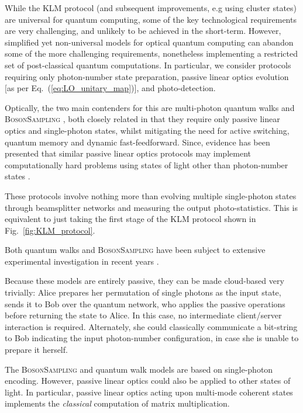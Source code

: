 While the KLM protocol (and subsequent improvements, e.g using cluster states) are universal for quantum computing, some of the key technological requirements are very challenging, and unlikely to be achieved in the short-term. However, simplified yet non-universal models for optical quantum computing can abandon some of the more challenging requirements, nonetheless implementing a restricted set of post-classical quantum computations. In particular, we consider protocols requiring only photon-number state preparation, passive linear optics evolution [as per Eq.~(\ref{eq:LO_unitary_map})], and photo-detection.

Optically, the two main contenders for this are multi-photon quantum walks \cite{bib:Aharonov93, bib:Aharonov01, bib:Kempe03, bib:Childs09, bib:Salvador12, bib:RohdeMultiWalk11} and \textsc{BosonSampling} \cite{bib:AaronsonArkhipov10, bib:RohdeIntroBS15}, both closely related in that they require only passive linear optics and single-photon states, whilst mitigating the need for active switching, quantum memory and dynamic fast-feedforward. Since, evidence has been presented that similar passive linear optics protocols may implement computationally hard problems using states of light other than photon-number states \cite{bib:RandBS, bib:RohdePhotAdd15, bib:RohdeDisp15, bib:RohdeCat15}.

These protocols involve nothing more than evolving multiple single-photon states through beamsplitter networks and measuring the output photo-statistics. This is equivalent to just taking the first stage of the KLM protocol shown in Fig.~\ref{fig:KLM_protocol}.

Both quantum walks and \textsc{BosonSampling} have been subject to extensive experimental investigation in recent years \cite{bib:PeruzzoQW, bib:Broome10, bib:Schreiber11b, bib:Owens11, bib:RohdeQWExp12, bib:Broome2012, bib:RohdeQWExp12, bib:Spring2, bib:Crespi3, bib:Tillmann4}.

Because these models are entirely passive, they can be made cloud-based very trivially: Alice prepares her permutation of single photons as the input state, sends it to Bob over the quantum network, who applies the passive operations before returning the state to Alice. In this case, no intermediate client/server interaction is required. Alternately, she could classically communicate a bit-string to Bob indicating the input photon-number configuration, in case she is unable to prepare it herself.

The \textsc{BosonSampling} and quantum walk models are based on single-photon encoding. However, passive linear optics could also be applied to other states of light. In particular, passive linear optics acting upon multi-mode coherent states implements the \textit{classical} computation of matrix multiplication.

